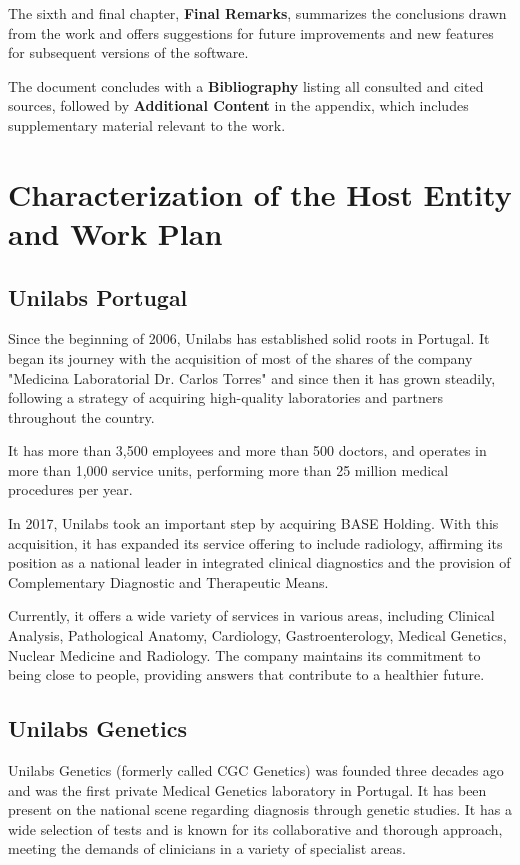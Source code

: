 The sixth and final chapter, \textbf{Final Remarks}, summarizes the conclusions drawn from the work and offers suggestions for future improvements and new features for subsequent versions of the software.

The document concludes with a \textbf{Bibliography} listing all consulted and cited sources, followed by \textbf{Additional Content} in the appendix, which includes supplementary material relevant to the work.

\section{Characterization of the Host Entity and Work Plan} \label{sec:intro_characterization}
\subsection{Unilabs Portugal} \label{subsec:unilabs}

Since the beginning of 2006, Unilabs has established solid roots in Portugal. It began its journey with the acquisition of most of the shares of the company "Medicina Laboratorial Dr. Carlos Torres" and since then it has grown steadily, following a strategy of acquiring high-quality laboratories and partners throughout the country. 

It has more than 3,500 employees and more than 500 doctors, and operates in more than 1,000 service units, performing more than 25 million medical procedures per year. 

In 2017, Unilabs took an important step by acquiring BASE Holding. With this acquisition, it has expanded its service offering to include radiology, affirming its position as a national leader in integrated clinical diagnostics and the provision of Complementary Diagnostic and Therapeutic Means. 

Currently, it offers a wide variety of services in various areas, including Clinical Analysis, Pathological Anatomy, Cardiology, Gastroenterology, Medical Genetics, Nuclear Medicine and Radiology. The company maintains its commitment to being close to people, providing answers that contribute to a healthier future. \cite{unilabs_sobre}

\subsection{Unilabs Genetics} \label{subsec:unilabs_genetics}
Unilabs Genetics (formerly called CGC Genetics) was founded three decades ago and was the first private Medical Genetics laboratory in Portugal. It has been present on the national scene regarding diagnosis through genetic studies. It has a wide selection of tests and is known for its collaborative and thorough approach, meeting the demands of clinicians in a variety of specialist areas. 

